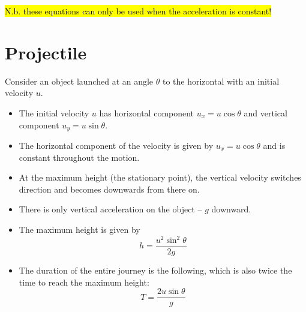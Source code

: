 \documentclass[a4paper,12pt]{article}
\let\oldsection\section
\renewcommand\section{\clearpage\oldsection}
\begin{document}
\hl{N.b. these equations can only be used when the acceleration is constant!}

\section{Projectile}

Consider an object launched at an angle $\theta$ to the horizontal with an initial velocity $u$.

\begin{figure}[H]
  \centering
\end{figure}

\begin{itemize}
  \item The initial velocity $u$ has horizontal component $u_x = u \cos \theta$ and vertical component $u_y = u \sin \theta$.
  \item The horizontal component of the velocity is given by $u_x = u \cos \theta$ and is constant throughout the motion.
  \item At the maximum height (the stationary point), the vertical velocity switches direction and becomes downwards from there on.
  \item There is only vertical acceleration on the object -- $g$ downward.
  \item The maximum height is given by
        $$h = \frac{u^2 \sin^2 \theta}{2g}$$
  \item The duration of the entire journey is the following, which is also twice the time to reach the maximum height:
        $$T = \frac{2u \sin \theta}{g}$$
\end{itemize}
\end{document}
